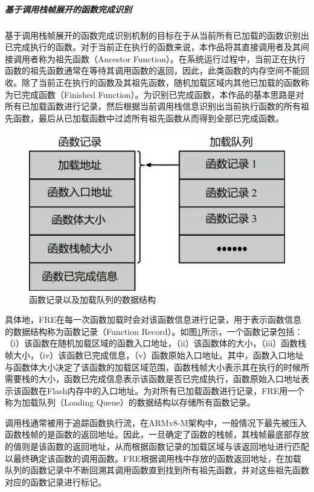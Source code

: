 \documentclass[12pt,a4paper]{ctexart}
\numberwithin{figure}{section}
\begin{document}
\subparagraph{基于调用栈帧展开的函数完成识别}
\par 基于调用栈帧展开的函数完成识别机制的目标在于从当前所有已加载的函数识别出已完成执行的函数。对于当前正在执行的函数来说，本作品将其直接调用者及其间接调用者称为祖先函数（Ancestor Function）。在系统运行过程中，当前正在执行函数的祖先函数通常在等待其调用函数的返回，因此，此类函数的内存空间不能回收。除了当前正在执行的函数及其祖先函数，随机加载区域内其他已加载的函数称为已完成函数（Finished Function）。为识别已完成函数，本作品的基本思路是对所有已加载函数进行记录，然后根据当前调用栈信息识别出当前执行函数的所有祖先函数，最后从已加载函数中过滤所有祖先函数从而得到全部已完成函数。
\begin{figure}[H]
    \centering
    \includegraphics[scale=0.5]{graph/dataStructure.png}
    \caption{函数记录以及加载队列的数据结构}
    \label{fig:dataStructure}
\end{figure}
\par 具体地，FRE在每一次函数加载时会对该函数信息进行记录，用于表示函数信息的数据结构称为函数记录（Function Record）。如图\ref{fig:dataStructure}所示，一个函数记录包括：（i）该函数在随机加载区域的函数入口地址，（ii）该函数体的大小，（iii）函数栈帧大小，（iv）该函数已完成信息，（v）函数原始入口地址。其中，函数入口地址与函数体大小决定了该函数的加载区域范围，函数栈帧大小表示其在执行的时候所需要栈的大小，函数已完成信息表示该函数是否已完成执行，函数原始入口地址表示该函数在Flash内存中的入口地址。为对所有已加载函数进行记录，FRE用一个称为加载队列（Loading Queue）的数据结构以存储所有函数记录。
\par 调用栈通常被用于追踪函数执行流，在ARMv8-M架构中，一般情况下最先被压入函数栈帧的是函数的返回地址。因此，一旦确定了函数的栈帧，其栈帧最底部存放的值则是该函数的返回地址，从而根据函数记录的加载区域与该返回地址进行匹配以最终确定该函数的调用函数。FRE根据调用栈中存放的函数返回地址，在加载队列的函数记录中不断回溯其调用函数直到找到所有祖先函数，并对这些祖先函数对应的函数记录进行标记。
\end{document}
